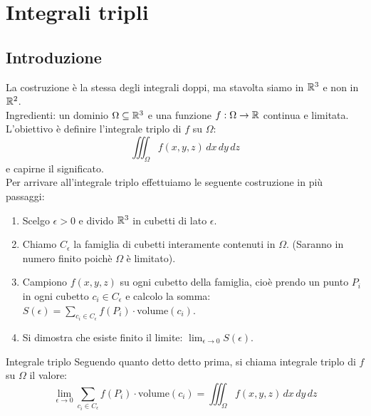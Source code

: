 \chapter{Integrali tripli}

\section{Introduzione}
La costruzione è la stessa degli integrali doppi, ma stavolta siamo in $\mathbb{R}^3$ e non in $\mathbb{R}^2$.\\
Ingredienti: un dominio $\Omega \subseteq \mathbb{R}^3$ e una funzione $f:\Omega \rightarrow \mathbb{R}$ continua e limitata.\\
L'obiettivo è definire l'integrale triplo di $f$ su $\Omega$:
\[
\iiint_{\Omega} f(x,y,z) \, dx \, dy \, dz
\]
e capirne il significato.\\
Per arrivare all'integrale triplo effettuiamo le seguente costruzione in più passaggi:
\begin{enumerate}
  \item Scelgo $\epsilon>0$ e divido $\mathbb{R}^3$ in cubetti di lato $\epsilon$.
  \item Chiamo $C_{\epsilon}$ la famiglia di cubetti interamente contenuti in $\Omega$. (Saranno in numero finito poichè $\Omega$ è limitato).
  \item Campiono $f(x,y,z)$ su ogni cubetto della famiglia, cioè prendo un punto $P_i$ in ogni cubetto $c_i\in C_{\epsilon}$ e calcolo la somma: $S(\epsilon)= \sum_{c_i \in C_{\epsilon}} f(P_i) \cdot \text{volume}(c_i)$.
  \item Si dimostra che esiste finito il limite: $\lim_{\epsilon \to 0} S(\epsilon)$.
\end{enumerate}

\begin{definizione}{Integrale triplo}
  Seguendo quanto detto detto prima, si chiama integrale triplo di $f$ su $\Omega$ il valore:
  \[
  \lim_{\epsilon \to 0} \sum_{c_i \in C_{\epsilon}} f(P_i) \cdot \text{volume}(c_i) = \iiint_{\Omega} f(x,y,z) \, dx \, dy \, dz
  \]
\end{definizione}


